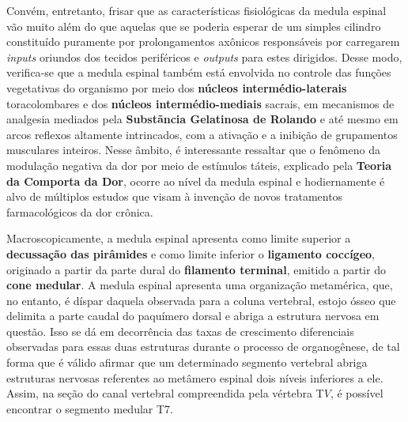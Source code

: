 \documentclass[
]{book}
\begin{document}
Convém, entretanto, frisar que as características fisiológicas da medula espinal vão muito além do que aquelas que se poderia esperar de um simples cilindro constituído puramente por prolongamentos axônicos responsáveis por carregarem \emph{inputs} oriundos dos tecidos periféricos e \emph{outputs} para estes dirigidos. Desse modo, verifica-se que a medula espinal também está envolvida no controle das funções vegetativas do organismo por meio dos \textbf{núcleos intermédio-laterais} toracolombares e dos \textbf{núcleos intermédio-mediais} sacrais, em mecanismos de analgesia mediados pela \textbf{Substãncia Gelatinosa de Rolando} e até mesmo em arcos reflexos altamente intrincados, com a ativação e a inibição de grupamentos musculares inteiros. Nesse âmbito, é interessante ressaltar que o fenômeno da modulação negativa da dor por meio de estímulos táteis, explicado pela \textbf{Teoria da Comporta da Dor}, ocorre ao nível da medula espinal e hodiernamente é alvo de múltiplos estudos que visam à invenção de novos tratamentos farmacológicos da dor crônica.

Macroscopicamente, a medula espinal apresenta como limite superior a \textbf{decussação das pirâmides} e como limite inferior o \textbf{ligamento coccígeo}, originado a partir da parte dural do \textbf{filamento terminal}, emitido a partir do \textbf{cone medular}. A medula espinal apresenta uma organização metamérica, que, no entanto, é díspar daquela observada para a coluna vertebral, estojo ósseo que delimita a parte caudal do paquímero dorsal e abriga a estrutura nervosa em questão. Isso se dá em decorrência das taxas de crescimento diferenciais observadas para essas duas estruturas durante o processo de organogênese, de tal forma que é válido afirmar que um determinado segmento vertebral abriga estruturas nervosas referentes ao metâmero espinal dois níveis inferiores a ele. Assim, na seção do canal vertebral compreendida pela vértebra T\(V\), é possível encontrar o segmento medular T7.
\end{document}
